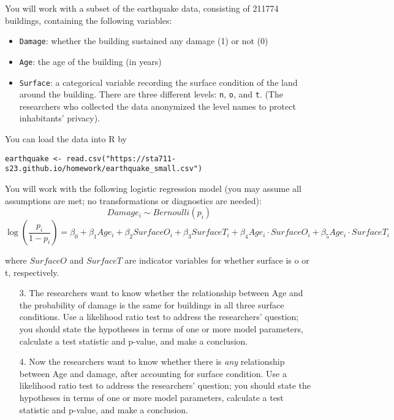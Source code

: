\documentclass[11pt]{article}
\begin{document}
\noindent You will work with a subset of the earthquake data, consisting of 211774 buildings, containing the following variables:
\begin{itemize}
\item \verb;Damage;: whether the building sustained any damage (1) or not (0)

\item \verb;Age;: the age of the building (in years)

\item \verb;Surface;: a categorical variable recording the surface condition of the land around the building. There are three different levels: \verb;n;, \verb;o;, and \verb;t;. (The researchers who collected the data anonymized the level names to protect inhabitants' privacy).
\end{itemize}

\noindent You can load the data into R by
\begin{verbatim}
earthquake <- read.csv("https://sta711-s23.github.io/homework/earthquake_small.csv")
\end{verbatim}

\noindent You will work with the following logistic regression model (you may assume all assumptions are met; no transformations or diagnostics are needed):
$$Damage_i \sim Bernoulli(p_i)$$
$$\log \left( \dfrac{p_i}{1 - p_i} \right) = \beta_0 + \beta_1 Age_i + \beta_2 SurfaceO_i + \beta_3 SurfaceT_i + \beta_4 Age_i \cdot SurfaceO_i + \beta_5 Age_i \cdot SurfaceT_i$$

where $SurfaceO$ and $SurfaceT$ are indicator variables for whether surface is o or t, respectively.\\

\begin{enumerate}

\item[3.] The researchers want to know whether the relationship between Age and the probability of damage is the same for buildings in all three surface conditions. Use a likelihood ratio test to address the researchers' question; you should state the hypotheses in terms of one or more model parameters, calculate a test statistic and p-value, and make a conclusion.

\item[4.] Now the researchers want to know whether there is \textit{any} relationship between Age and damage, after accounting for surface condition. Use a likelihood ratio test to address the researchers' question; you should state the hypotheses in terms of one or more model parameters, calculate a test statistic and p-value, and make a conclusion.
\end{enumerate}
\end{document}
